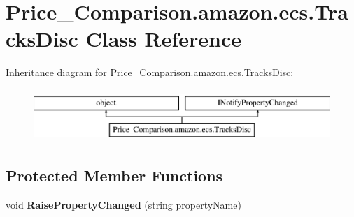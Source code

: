\hypertarget{class_price___comparison_1_1amazon_1_1ecs_1_1_tracks_disc}{\section{Price\-\_\-\-Comparison.\-amazon.\-ecs.\-Tracks\-Disc Class Reference}
\label{class_price___comparison_1_1amazon_1_1ecs_1_1_tracks_disc}
}


 


Inheritance diagram for Price\-\_\-\-Comparison.\-amazon.\-ecs.\-Tracks\-Disc\-:\begin{figure}[H]
\begin{center}
\leavevmode
\includegraphics[height=2.000000cm]{class_price___comparison_1_1amazon_1_1ecs_1_1_tracks_disc}
\end{center}
\end{figure}
\subsection*{Protected Member Functions}
\begin{DoxyCompactItemize}
\item 
\hypertarget{class_price___comparison_1_1amazon_1_1ecs_1_1_tracks_disc_a5ae465675d99cedcb9cfa7171f795e78}{void {\bfseries Raise\-Property\-Changed} (string property\-Name)}\label{class_price___comparison_1_1amazon_1_1ecs_1_1_tracks_disc_a5ae465675d99cedcb9cfa7171f795e78}

\end{DoxyCompactItemize}
